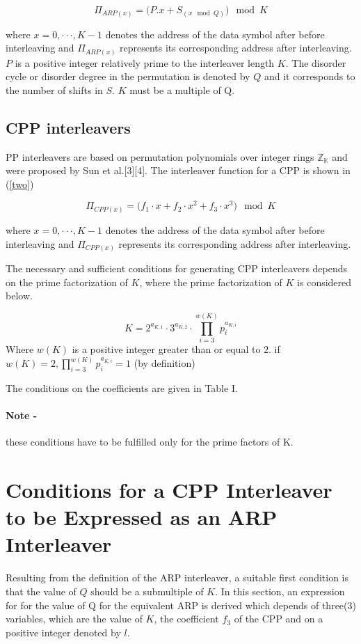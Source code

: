 \documentclass[fontsize=12pt]{article}
\begin{document}
 \begin{equation}
 \Pi_{ARP(x)} =\Big(P.x + S_{(x \mod Q)}\Big)\mod K
 \end{equation}
 
 where $x = 0, \cdot\cdot\cdot , K - 1$ denotes the address of the data
symbol after before interleaving and $ \Pi_{ARP(x)}$ represents its corresponding
address after interleaving. $P$ is a positive integer
relatively prime to the interleaver length $K$. The disorder cycle
or disorder degree in the permutation is denoted by $Q$ and it
corresponds to the number of shifts in $S$. $K$ must be a multiple
of Q.

 \subsection{CPP interleavers}
 PP interleavers are based on permutation polynomials over integer rings $\mathbb{Z_K}$ and were proposed by Sun et al.[3][4]. The interleaver function for a CPP is shown in (\ref{two})
 
  \begin{equation}
 \Pi_{CPP(x)} =\Big(f_1\cdot x + f_2\cdot x^2 +f_3 \cdot x^3\Big) \mod K
 \label{two}
 \end{equation}
 
 where $x = 0, \cdot\cdot\cdot , K - 1$ denotes the address of the data
symbol after before interleaving and $ \Pi_{CPP(x)}$ represents its corresponding
address after interleaving. 

The necessary and sufficient conditions for generating CPP interleavers depends on the prime factorization of $K$, where the prime factorization of $K$ is considered below.

\begin{equation}
 K =2^{a_{K,1}}\cdot 3^{a_{K,2}}\cdot \prod^{w(K)}_{i=3}p_i^{a_{K,i}}
 \label{three}
 \end{equation}
 Where $w(K)$ is a positive integer greater than or equal to $2$. if $w(K)=2,\prod^{w(K)}_{i=3}p_i^{a_{K,i}}=1 $ (by definition)

 
 The conditions on the coefficients are given in Table I.
\paragraph{Note - } these conditions have to be fulfilled only for
the prime factors of K.

\section{Conditions for a CPP Interleaver to be  Expressed as an ARP Interleaver}
Resulting from the definition of the ARP interleaver, a suitable first condition is that the value of $Q$ should be a submultiple of $K$. In this section, an expression for for the value of Q for the equivalent ARP is derived which depends of three(3) variables, which are the value of $K$, the coefficient $f_3$ of the CPP and on a positive integer denoted by $l$.
\end{document}
